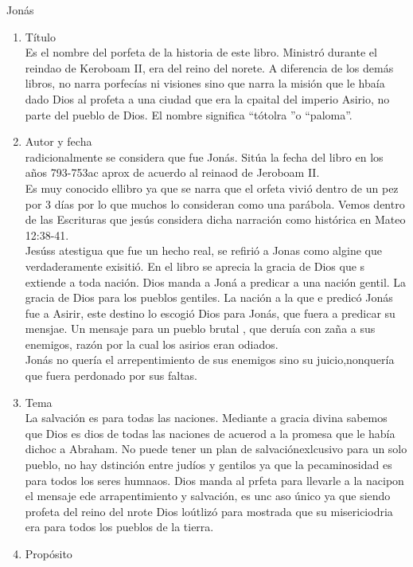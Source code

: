 \documentclass[12pt]{article}
\begin{document}
\begin{section}{Jonás}
	\begin{enumerate}
		\item Título\\
			Es el nombre del porfeta de la historia de este libro. Ministró durante el reindao de Keroboam II, era del reino del norete. A diferencia de los demás libros, no narra porfecías ni visiones sino que narra la misión que le hbaía dado Dios al profeta a una ciudad que era la cpaital del imperio Asirio, no parte del pueblo de Dios. El nombre significa ``tótolra ''o ``paloma''.
		\item Autor y fecha\\
			radicionalmente se considera que fue Jonás. Sitúa la fecha del libro en los años 793-753ac aprox de acuerdo al reinaod de Jeroboam II.\\
			Es muy conocido ellibro ya que se narra que el orfeta vivió dentro de un pez por 3 días por lo que muchos lo consideran como una parábola. Vemos dentro de las Escrituras que jesús considera dicha narración como histórica en Mateo 12:38-41.\\
			Jesúss atestigua que fue un hecho real, se refirió a Jonas como algine que verdaderamente exisitió. En el libro se aprecia la gracia de Dios que s extiende a toda nación. Dios manda a Joná a predicar a una nación gentil. La gracia de Dios para los pueblos gentiles. La nación a la que e predicó Jonás fue a Asirir, este destino lo escogió Dios para Jonás, que fuera a predicar su mensjae. Un mensaje para un pueblo brutal , que deruía con zaña a sus enemigos, razón por la cual los asirios eran odiados.\\
			Jonás no quería el arrepentimiento de sus enemigos sino su juicio,nonquería que fuera perdonado por sus faltas.
		\item Tema\\
			La salvación es para todas las naciones. Mediante a gracia divina sabemos que Dios es dios de todas las naciones de acuerod a la promesa que le había dichoc a Abraham. No puede tener un plan de salvaciónexlcusivo para un solo pueblo, no hay dstinción entre judíos y gentilos ya que la pecaminosidad es para todos los seres humnaos. Dios manda al prfeta para llevarle a la nacipon el mensaje ede arrapentimiento y salvación, es unc aso único ya que siendo profeta del reino del nrote Dios loútlizó para mostrada que su misericiodria era para todos los pueblos de la tierra.
		\item Propósito\\

\end{enumerate}
\end{section}
\end{document}
